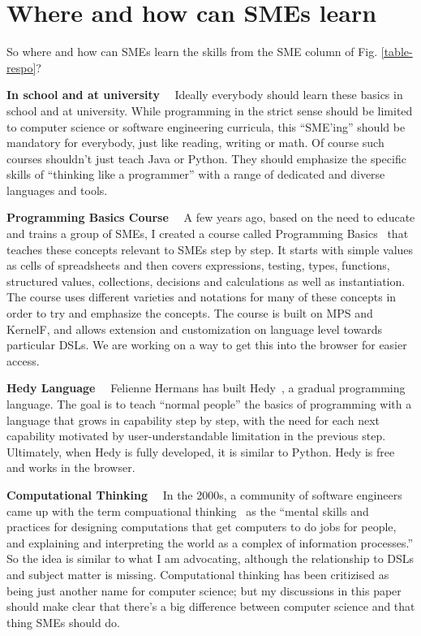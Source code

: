 \documentclass[runningheads]{llncs}
\newcommand\parhead[1]{\vspace{1mm}\noindent\textbf{{#1}}\ \ }
\newcommand{\fig}[1]{Fig. \ref{#1}}  %
\begin{document}
\section{Where and how can SMEs learn}

So where and how can SMEs learn the skills from the SME column of \fig{table-respo}? 

\parhead{In school and at university} Ideally everybody should learn these
basics in school and at university. While programming in the strict sense should
be limited to computer science or software engineering curricula, this
``SME'ing'' should be mandatory for everybody, just like reading, writing or
math. Of course such courses shouldn't just teach Java or Python. They should
emphasize the specific skills of ``thinking like a programmer'' with a range of
dedicated and diverse languages and tools.

\parhead{Programming Basics Course} A few years ago, based on the need to
educate and trains a group of SMEs, I created a course called Programming
Basics~\cite{voelterProgBas} that teaches these concepts relevant to SMEs step
by step. It starts with simple values as cells of spreadsheets and then covers
expressions, testing, types, functions, structured values, collections,
decisions and calculations as well as instantiation. The course uses different
varieties and notations for many of these concepts in order to try and emphasize
the concepts. The course is built on MPS and KernelF, and allows extension and
customization on language level towards particular DSLs. We are working on a way
to get this into the browser for easier access.


\parhead{Hedy Language} Felienne Hermans has built Hedy~\cite{hedy}, a gradual
programming language. The goal is to teach ``normal people'' the basics of
programming with a language that grows in capability step by step, with the need
for each next capability motivated by user-understandable limitation in the
previous step. Ultimately, when Hedy is fully developed, it is similar to
Python. Hedy is free and works in the browser.


\parhead{Computational Thinking} In the 2000s, a community of software engineers
came up with the term compuational thinking~\cite{denning2019computational} as
the ``mental skills and practices for designing computations that get computers
to do jobs for people, and explaining and interpreting the world as a complex of
information processes.'' So the idea is similar to what I am advocating,
although the relationship to DSLs and subject matter is missing. Computational
thinking has been critizised as being just another name for computer science; but
my discussions in this paper should make clear that there's a big difference
between computer science and that thing SMEs should do.
\end{document}
